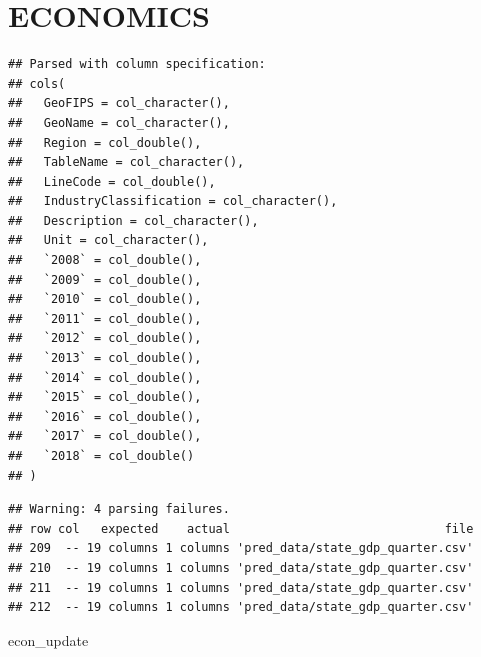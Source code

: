 \documentclass[
]{article}
\newenvironment{Shaded}{\begin{snugshade}}{\end{snugshade}}
\newcommand{\DataTypeTok}[1]{\textcolor[rgb]{0.13,0.29,0.53}{#1}}
\newcommand{\DecValTok}[1]{\textcolor[rgb]{0.00,0.00,0.81}{#1}}
\newcommand{\KeywordTok}[1]{\textcolor[rgb]{0.13,0.29,0.53}{\textbf{#1}}}
\newcommand{\NormalTok}[1]{#1}
\newcommand{\OperatorTok}[1]{\textcolor[rgb]{0.81,0.36,0.00}{\textbf{#1}}}
\newcommand{\StringTok}[1]{\textcolor[rgb]{0.31,0.60,0.02}{#1}}
\begin{document}
\hypertarget{economics}{%
\section{ECONOMICS}\label{economics}}

\begin{Shaded}
\end{Shaded}

\begin{verbatim}
## Parsed with column specification:
## cols(
##   GeoFIPS = col_character(),
##   GeoName = col_character(),
##   Region = col_double(),
##   TableName = col_character(),
##   LineCode = col_double(),
##   IndustryClassification = col_character(),
##   Description = col_character(),
##   Unit = col_character(),
##   `2008` = col_double(),
##   `2009` = col_double(),
##   `2010` = col_double(),
##   `2011` = col_double(),
##   `2012` = col_double(),
##   `2013` = col_double(),
##   `2014` = col_double(),
##   `2015` = col_double(),
##   `2016` = col_double(),
##   `2017` = col_double(),
##   `2018` = col_double()
## )
\end{verbatim}

\begin{verbatim}
## Warning: 4 parsing failures.
## row col   expected    actual                              file
## 209  -- 19 columns 1 columns 'pred_data/state_gdp_quarter.csv'
## 210  -- 19 columns 1 columns 'pred_data/state_gdp_quarter.csv'
## 211  -- 19 columns 1 columns 'pred_data/state_gdp_quarter.csv'
## 212  -- 19 columns 1 columns 'pred_data/state_gdp_quarter.csv'
\end{verbatim}

\begin{Shaded}
\begin{Highlighting}[]
\NormalTok{econ_update}
\end{Highlighting}
\end{Shaded}
\end{document}
